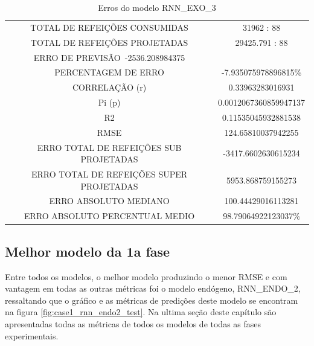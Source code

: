 \documentclass[	12pt, Times, openright, twoside, a4paper, english, brazil]{abntex2}
\begin{document}
                \begin{figure}[H]
                \end{figure}
                
                 \begin{table}[!ht]
                \centering
                \caption{Erros do modelo  RNN\_EXO\_3 }
                    \begin{tabular}{|c|c|}
                    \rowcolor{gray!50}
                    \hline
               \multicolumn{2}{c}{ RNN\_EXO\_3:} \\ \hline
                TOTAL DE REFEIÇÕES CONSUMIDAS & 31962 : 88 \\
                TOTAL DE REFEIÇÕES PROJETADAS  & 29425.791 : 88 \\
                ERRO DE PREVISÃO\ -2536.208984375\\ 
                PERCENTAGEM DE ERRO &-7.935075978896815\% \\
                CORRELAÇÃO (r) & 0.33963283016931 \\ Pi (p)& 0.0012067360859947137 \\R2 & 0.11535045932881538\\
                RMSE & 124.65810037942255\\
                ERRO TOTAL DE REFEIÇÕES SUB PROJETADAS & -3417.6602630615234\\
                ERRO TOTAL DE REFEIÇÕES SUPER PROJETADAS & 5953.868759155273\\
                ERRO ABSOLUTO MEDIANO & 100.44429016113281\\
                ERRO ABSOLUTO PERCENTUAL MEDIO & 98.79064922123037\% \\ \hline \end{tabular} \end{table}
            
    	    \subsection{Melhor modelo da 1a fase}
                Entre todos os modelos, o melhor modelo produzindo o menor RMSE e com vantagem em todas as outras métricas foi o modelo endógeno, RNN\_ENDO\_2, ressaltando que o gráfico e as métricas de predições deste modelo se encontram na figura \ref{fig:case1_rnn_endo2_test}.
                Na ultima seção deste capítulo são apresentadas todas as métricas de todos os modelos de todas as fases experimentais.
\end{document}
